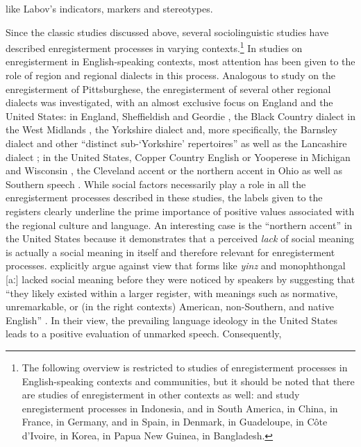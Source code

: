 like Labov’s indicators, markers and stereotypes.

Since the classic studies discussed above, several sociolinguistic studies have described enregisterment processes in varying contexts.\footnote{The following overview is restricted to studies of enregisterment processes in English-speaking contexts and communities, but it should be noted that there are studies of enregisterment in other contexts as well:  \citet{Cole2010} and  \citet{Goebel2007, Goebel2008, Goebel2012} study enregisterment processes in Indonesia, \citet{Babel2011} and \citet{Romero2012} in South America, \citet{Dong2010} in China, \citet{Eggert2017} in France, \citet{Elmentaler2017} in Germany, \citet{Frekko2009} and \citet{Peter2020} in Spain, \citet{Madsen2013} in Denmark, \citet{Managan2011} in Guadeloupe, \citet{Newell2009} in Côte d’Ivoire, \citet{Park2016} in Korea, \citet{Slotta2012} in Papua New Guinea, \citet{Wilce2008} in Bangladesh.} In studies on enregisterment in English-speaking contexts, most attention has been given to the role of region and regional dialects in this process. Analogous to  study on the enregisterment of Pittsburghese, the enregisterment of several other regional dialects was investigated, with an almost exclusive focus on England and the United States: in England, Sheffieldish and Geordie \citep{Beal2009}, the Black Country dialect in the West Midlands \citep{Clark2013}, the Yorkshire dialect \citep{Cooper2013} and, more specifically, the Barnsley dialect \citep{Cooper2019} and other “distinct sub-‘Yorkshire’ repertoires” \citep[128]{Cooper2020} as well as the Lancashire dialect \citep{RuanoGarcia2020}; in the United States, Copper Country English or Yooperese in Michigan and Wisconsin \citep{Remlinger2009,Remlinger2009b,Remlinger2017}, the Cleveland accent or the northern accent in Ohio \citep{CampbellKibler2012,CampbellKibler2015} as well as Southern speech \citep{Cramer2013}. While social factors necessarily play a role in all the enregisterment processes described in these studies, the labels given to the registers clearly underline the prime importance of positive values associated with the regional culture and language. An interesting case is the “northern accent” in the United States because it demonstrates that a perceived \textit{lack} of social meaning is actually a social meaning in itself and therefore relevant for enregisterment processes. \citet{CampbellKibler2015} explicitly argue against  view that forms like \emph{yinz} and monophthongal [aː] lacked social meaning before they were noticed by speakers by suggesting that “they likely existed within a larger register, with meanings such as normative, unremarkable, or (in the right contexts) American, non-Southern, and native English” \citep[98]{CampbellKibler2015}. In their view, the prevailing language ideology in the United States leads to a positive evaluation of unmarked speech. Consequently,

